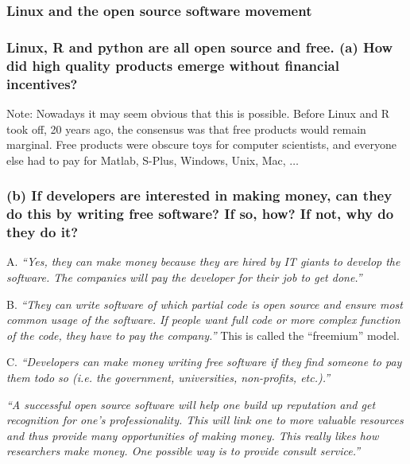 \documentclass[12pt]{beamer}
\newcommand\ans[1]{{\it ``#1''}}
\newcommand\gap{\vspace{5mm}}
\begin{document}

\begin{frame}
  \frametitle{Linux and the open source software movement}
    
\end{frame}

\begin{frame} %

  \frametitle{Linux, R and python are all open source and free. (a) How did high quality products emerge without financial incentives?}

  Note: Nowadays it may seem obvious that this is possible. Before Linux and R took off, 20 years ago, the consensus was that free products would remain marginal. Free products were obscure toys for computer scientists, and everyone else had to pay for Matlab, S-Plus, Windows, Unix, Mac, $\dots$
  
\end{frame}

\begin{frame} %

  \frametitle{(b) If developers are interested in making money, can they do this by writing free software? If so, how? If not, why do they do it?}

A.  \ans{Yes, they can make money because they are hired by IT giants to develop the software. The companies will pay the developer for their job to get done.}

  \gap

 B. \ans{They can write software of which partial code is open source and ensure most common usage of the software.  If people want full code or more complex function of the code, they have to pay the company.} This is called the ``freemium'' model.

  \gap
  
C.  \ans{Developers can make money writing free software if they find someone to pay them todo so (i.e.  the government, universities, non-profits, etc.).}
  
  \end{frame}

\begin{frame}
  
  \ans{A successful open source software will help one build up reputation and get recognition for one’s professionality.  This will link one to more valuable resources and thus provide many opportunities of making money.  This really likes how researchers make money.  One possible way is to provide consult service.}

\end{frame}
\end{document}
